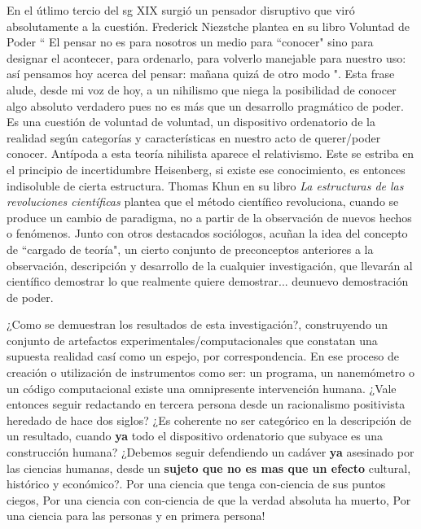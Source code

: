 En el útlimo tercio del sg XIX surgió un pensador disruptivo que viró absolutamente a la cuestión. Frederick Niezstche plantea en su libro Voluntad de Poder \cite{nietzsche2018voluntad} `` El pensar no es para nosotros un medio para ``conocer" sino para designar el acontecer, para ordenarlo, para volverlo manejable para nuestro uso: así pensamos hoy acerca del pensar: mañana quizá de otro modo ". Esta frase alude, desde mi voz de hoy, a un nihilismo que niega la posibilidad de conocer algo absoluto verdadero pues no es más que un desarrollo pragmático de poder. Es una cuestión de voluntad de voluntad, un dispositivo ordenatorio de la realidad según categorías y características en nuestro acto de querer/poder conocer. Antípoda a esta teoría nihilista aparece el relativismo. Este se estriba en el principio de incertidumbre Heisenberg, si existe ese conocimiento, es entonces indisoluble de cierta estructura. Thomas Khun en su libro \emph{La estructuras de las revoluciones científicas} \cite{kuhn2019estructura} plantea que el método científico revoluciona, cuando se produce un cambio de paradigma, no a partir de la observación de nuevos hechos o fenómenos. Junto con otros destacados sociólogos, acuñan la idea del concepto de ``cargado de teoría", un cierto conjunto de preconceptos anteriores a la observación, descripción y desarrollo de la cualquier investigación, que llevarán al científico demostrar lo que realmente quiere demostrar... deunuevo demostración de poder.

¿Como se demuestran los resultados de esta investigación?, construyendo un conjunto de artefactos experimentales/computacionales que constatan una supuesta realidad casí como un espejo, por correspondencia. En ese proceso de creación o utilización de instrumentos como ser: un programa, un nanemómetro o un código computacional existe una omnipresente intervención humana. ¿Vale entonces seguir redactando en tercera persona desde un racionalismo positivista heredado de hace dos siglos? ¿Es coherente no ser categórico en la descripción de un resultado, cuando \textbf{ya} todo el dispositivo ordenatorio que subyace es una construcción humana? ¿Debemos seguir defendiendo un cadáver \textbf{ya} asesinado por las ciencias humanas, desde un \textbf{sujeto que no es mas que un efecto} cultural, histórico y económico?. Por una ciencia que tenga con-ciencia de sus puntos ciegos, Por una ciencia con con-ciencia de que la verdad absoluta ha muerto, Por una ciencia para las personas y en primera persona! 


